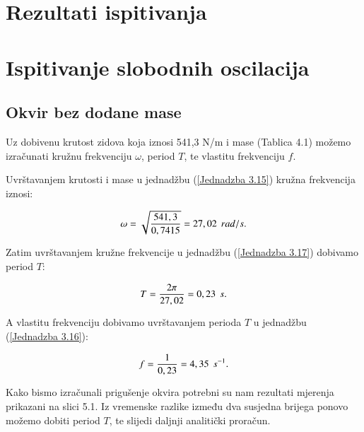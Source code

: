 \documentclass[12pt]{book}
\begin{document}
\section{Rezultati ispitivanja}

\section{Ispitivanje slobodnih oscilacija}

\subsection{Okvir bez dodane mase}

Uz dobivenu krutost zidova koja iznosi 541,3 N/m i mase (Tablica 4.1) možemo izračunati kružnu frekvenciju $\omega$, period $T$, te vlastitu frekvenciju $f$.

Uvrštavanjem krutosti i mase u jednadžbu (\ref{Jednadzba 3.15}) kružna frekvencija iznosi:

\begin{equation}\label{Jednadzba 5.1}
	\omega = \sqrt{\frac{541,3}{0,7415}} = 27,02 \hspace{0.15cm} rad/s.
\end{equation}

Zatim uvrštavanjem kružne frekvencije u jednadžbu (\ref{Jednadzba 3.17}) dobivamo period $T$:

\begin{equation}\label{Jednadzba 5.2}
	T = \frac{2\pi}{27,02} = 0,23 \hspace{0.15cm} s.
\end{equation}

A vlastitu frekvenciju dobivamo uvrštavanjem perioda $T$ u jednadžbu (\ref{Jednadzba 3.16}):

\begin{equation}\label{Jednadzba 5.3}
	f = \frac{1}{0,23} = 4,35 \hspace{0.15cm} s^{-1}.
\end{equation}

Kako bismo izračunali prigušenje okvira potrebni su nam rezultati mjerenja prikazani na slici 5.1. Iz vremenske razlike između dva susjedna brijega ponovo možemo dobiti period $T$, te slijedi daljnji analitički proračun.
\end{document}
